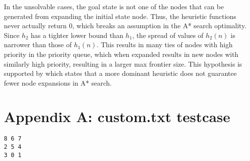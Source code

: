 \documentclass[10pt, a4paper]{article}
\theoremstyle{definition}
\begin{document}
In the unsolvable cases, the goal state is not one of the nodes that can be generated from expanding the initial state node.
Thus, the heuristic functions never actually return $0$, which breaks an assumption in the A* search optimality.
Since $h_2$ has a tighter lower bound than $h_1$, the spread of values of $h_2(n)$ is narrower than those of $h_1(n)$.
This results in many ties of nodes with high priority in the priority queue, which when expanded results in new nodes with similarly high priority, resulting in a larger max frontier size. This hypothesis is supported by  which states that a more dominant heuristic does not guarantee fewer node expansions in A* search.




\section*{Appendix A: custom.txt testcase}
\begin{verbatim}
8 6 7
2 5 4
3 0 1
\end{verbatim}
\end{document}
